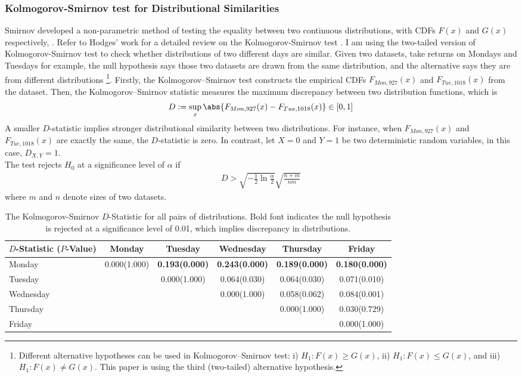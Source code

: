 \documentclass[12pt]{article}
\begin{document}
	\subsubsection{Kolmogorov-Smirnov test for Distributional Similarities}
	\par Smirnov developed a non-parametric method of testing the equality between two continuous distributions, with CDFs $F(x)$ and $G(x)$ respectively, \cite{Smirnov1939}. Refer to Hodges' work for a detailed review on the Kolmogorov-Smirnov test \cite{Hodges1957}. I am using the two-tailed version of Kolmogorov-Smirnov test to check whether distributions of two different days are similar.
	Given two datasets, take returns on Mondays and Tuesdays for example, the null hypothesis says those two datasets are drawn from the same distribution, and the alternative says they are from different distributions \footnote{Different alternative hypotheses can be used in Kolmogorov–Smirnov test: i) $H_1: F(x) \geq G(x)$, ii) $H_1: F(x) \leq G(x)$, and iii) $H_1: F(x) \neq G(x)$. This paper is using the third (two-tailed) alternative hypothesis.}.
	Firstly, the Kolmogorov–Smirnov test constructs the empirical CDFs $F_{Mon, 927}(x)$ and $F_{Tue, 1018}(x)$ from the dataset. Then, the Kolmogorov–Smirnov statistic measures the maximum discrepancy between two distribution functions, which is
	\begin{align}
		D := \sup_x \abs{F_{Mon, 927}(x) - F_{Tue, 1018}(x)} \in [0, 1]
	\end{align}
	A smaller $D$-statistic implies stronger distributional similarity between two distributions. For instance, when $F_{Mon, 927}(x)$ and $F_{Tue, 1018}(x)$ are exactly the same, the $D$-statistic is zero. In contrast, let $X=0$ and $Y=1$ be two deterministic random variables, in this case, $D_{X, Y} = 1$.\\
	The test rejects $H_0$ at a significance level of $\alpha$ if 
	\begin{align}
		D > \sqrt{-\frac{1}{2} \ln \frac{\alpha}{2}} \sqrt{\frac{n+m}{nm}}
	\end{align}
	where $m$ and $n$ denote sizes of two datasets.
	\begin{table}[H]
		\small
		\centering
		\begin{tabular}{l|c|c|c|c|c}
			\toprule
			$D$-Statistic ($P$-Value) & Monday & Tuesday & Wednesday & Thursday & Friday \\
			\midrule
Monday & 0.000(1.000) & \textbf{0.193(0.000)} &  \textbf{0.243(0.000)} &  \textbf{0.189(0.000)} &  \textbf{0.180(0.000)} \\
Tuesday & &  0.000(1.000) &  0.064(0.030) &  0.064(0.030) &  0.071(0.010) \\
Wednesday & & &  0.000(1.000) &  0.058(0.062) &  0.084(0.001) \\
Thursday & & & &  0.000(1.000) &  0.030(0.729) \\
Friday & & & & &  0.000(1.000) \\
			\bottomrule
		\end{tabular}
		\caption{The Kolmogorov-Smirnov $D$-Statistic for all pairs of distributions. Bold font indicates the null hypothesis is rejected at a significance level of 0.01, which implies discrepancy in distributions.}
	\end{table}
\end{document}
